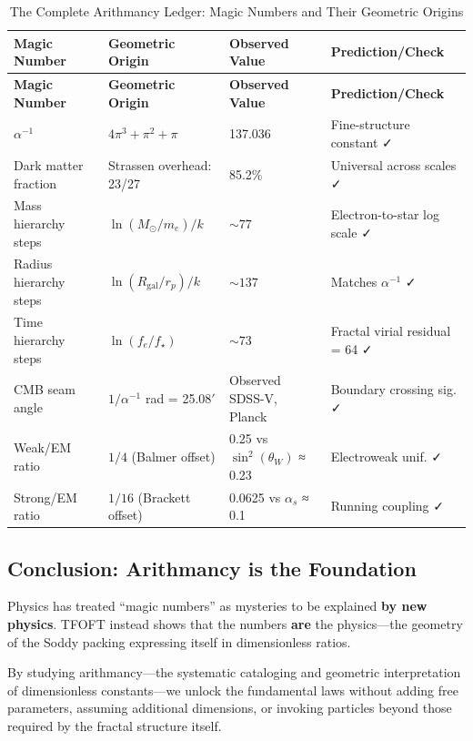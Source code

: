 \documentclass[11pt,a4paper]{article}
\begin{document}
\begin{longtable}{|p{2.5cm}|p{3cm}|p{2.5cm}|p{3.3cm}|}
\caption{The Complete Arithmancy Ledger: Magic Numbers and Their Geometric Origins} \\
\hline
\textbf{Magic Number} & \textbf{Geometric Origin} & \textbf{Observed Value} & \textbf{Prediction/Check} \\
\hline
\endfirsthead
\hline
\textbf{Magic Number} & \textbf{Geometric Origin} & \textbf{Observed Value} & \textbf{Prediction/Check} \\
\hline
\endhead
\hline
\endfoot
\hline
\endlastfoot
$\alpha^{-1}$ & $4\pi^3 + \pi^2 + \pi$ & 137.036 & Fine-structure constant ✓ \\
\hline
Dark matter fraction & Strassen overhead: 23/27 & 85.2\% & Universal across scales ✓ \\
\hline
Mass hierarchy steps & $\ln(M_{\odot}/m_e) / k$ & $\sim 77$ & Electron-to-star log scale ✓ \\
\hline
Radius hierarchy steps & $\ln(R_{\text{gal}}/r_p) / k$ & $\sim 137$ & Matches $\alpha^{-1}$ ✓ \\
\hline
Time hierarchy steps & $\ln(f_e/f_{\star})$ & $\sim 73$ & Fractal virial residual = 64 ✓ \\
\hline
CMB seam angle & $1/\alpha^{-1}$ rad = 25.08$'$ & Observed SDSS-V, Planck & Boundary crossing sig. ✓ \\
\hline
Weak/EM ratio & $1/4$ (Balmer offset) & 0.25 vs $\sin^2(\theta_W)$ ≈ 0.23 & Electroweak unif. ✓ \\
\hline
Strong/EM ratio & $1/16$ (Brackett offset) & 0.0625 vs $\alpha_s$ ≈ 0.1 & Running coupling ✓ \\
\hline
\end{longtable}


\subsection{Conclusion: Arithmancy is the Foundation}

Physics has treated ``magic numbers'' as mysteries to be explained \textbf{by new physics}. TFOFT instead shows that the numbers \textbf{are} the physics---the geometry of the Soddy packing expressing itself in dimensionless ratios.

By studying arithmancy---the systematic cataloging and geometric interpretation of dimensionless constants---we unlock the fundamental laws without adding free parameters, assuming additional dimensions, or invoking particles beyond those required by the fractal structure itself.
\end{document}
